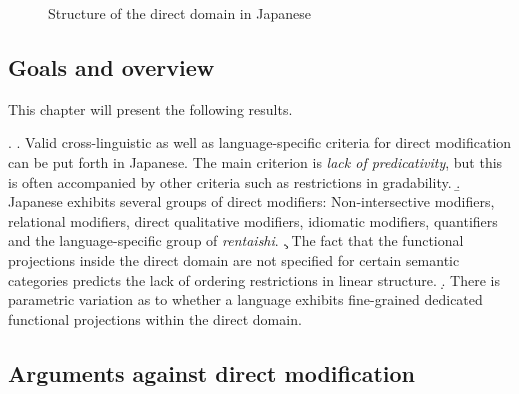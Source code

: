 \begin{figure}



 \caption{Structure of the direct domain in Japanese}
 \label{fig:Structure of the Direct Domain in Japanese2}
\end{figure}



\subsection{Goals and overview}

This chapter will present the following results.

\ex. \a. Valid cross-linguistic as well as language-specific criteria for direct modification can be put forth in Japanese. The main criterion is \textit{lack of predicativity}, but this is often accompanied by other criteria such as restrictions in gradability.
\b. Japanese exhibits several groups of direct modifiers: Non-intersective modifiers, relational modifiers, direct qualitative modifiers, idiomatic modifiers, quantifiers and the language-specific group of \textit{rentaishi}.
\c. The fact that the functional projections inside the direct domain are not specified for certain semantic categories predicts the lack of ordering restrictions in linear structure.
\d. There is parametric variation as to whether a language exhibits fine-grained dedicated functional projections within the direct domain.

\subsection{Arguments against direct modification}

